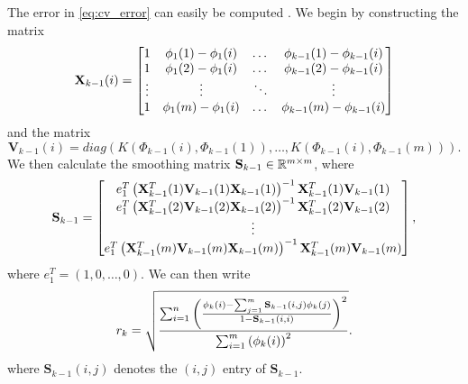 The error in \eqref{eq:cv_error} can easily be computed \cite{wasserman2006all}.
%
We begin by constructing the matrix
\begin{equation}
\mathbf{X}_{k-1}(i) = \begin{bmatrix}
1 & \phi_1(1) - \phi_1(i) & \dots & \phi_{k-1}(1)- \phi_{k-1}(i) \\
1 & \phi_1(2) - \phi_1(i) & \dots & \phi_{k-1}(2)- \phi_{k-1}(i) \\
\vdots & \vdots & \ddots & \vdots \\
1 & \phi_1(m) - \phi_1(i) & \dots & \phi_{k-1}(m)- \phi_{k-1}(i)
\end{bmatrix}
\end{equation}
%
and the matrix
\begin{equation}
\mathbf{V}_{k-1}(i) = diag \left( K(\Phi_{k-1}(i), \Phi_{k-1}(1)), \dots, K(\Phi_{k-1}(i), \Phi_{k-1}(m)) \right).
\end{equation}
%
We then calculate the smoothing matrix $\mathbf{S}_{k-1} \in \mathbb{R}^{m \times m}$, where
\begin{equation}
\mathbf{S}_{k-1} =
\begin{bmatrix}
e_1^T \left( \mathbf{X}_{k-1}^T(1) \mathbf{V}_{k-1}(1) \mathbf{X}_{k-1}(1) \right) ^{-1} \mathbf{X}_{k-1}^T(1) \mathbf{V}_{k-1}(1) \\
e_1^T \left( \mathbf{X}_{k-1}^T(2) \mathbf{V}_{k-1}(2) \mathbf{X}_{k-1}(2) \right) ^{-1} \mathbf{X}_{k-1}^T(2) \mathbf{V}_{k-1}(2) \\
\vdots \\
e_1^T \left( \mathbf{X}_{k-1}^T(m) \mathbf{V}_{k-1}(m) \mathbf{X}_{k-1}(m) \right) ^{-1} \mathbf{X}_{k-1}^T(m) \mathbf{V}_{k-1}(m) \\
\end{bmatrix},
\end{equation}
%
where $e_1^T = (1, 0, \dots, 0)$.
%
We can then write
%
\begin{equation}
r_{k} = \sqrt{ \frac{\sum_{i=1}^n \left( \frac{ \phi_{k} (i) - \sum_{j=1}^m \mathbf{S}_{k-1}(i,j) \phi_{k}(j) }{1-\mathbf{S}_{k-1}(i,i)} \right)^2} {\sum_{i=1}^m \left( \phi_{k} (i) \right)^2 }} .
\end{equation}
%
where $\mathbf{S}_{k-1}(i,j)$ denotes the $(i,j)$ entry of $\mathbf{S}_{k-1}$. 

